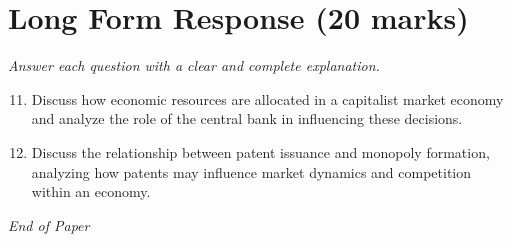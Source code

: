 \documentclass[12pt]{article}
\begin{document}
\section*{Long Form Response (20 marks)}
\textit{Answer each question with a clear and complete explanation.}
\begin{enumerate}[label=\arabic*.]
\setcounter{enumi}{10}
\item Discuss how economic resources are allocated in a capitalist market economy and analyze the role of the central bank in influencing these decisions.
\item Discuss the relationship between patent issuance and monopoly formation, analyzing how patents may influence market dynamics and competition within an economy.
\end{enumerate}

\vfill
\noindent\textit{End of Paper}
\end{document}
